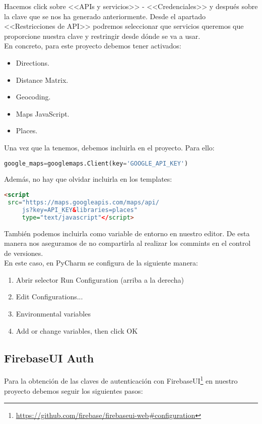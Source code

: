 Hacemos click sobre <<APIs y servicios>> - <<Credenciales>> y después sobre la clave que se nos ha generado anteriormente. Desde el apartado <<Restricciones de API>> podremos seleccionar que servicios queremos que proporcione nuestra clave y restringir desde dónde se va a usar.\\
En concreto, para este proyecto debemos tener activados:
\begin{itemize}
	\item Directions.
	\item Distance Matrix.
	\item Geocoding.
	\item Maps JavaScript.
	\item Places.
\end{itemize}


Una vez que la tenemos, debemos incluirla en el proyecto. Para ello:
\renewcommand{\lstlistingname}{Google Key}%
\renewcommand{\lstlistlistingname}{List of \lstlistingname s}
\begin{lstlisting}[language=python,caption={Añadir \texttt{API\_KEY}}]
google_maps=googlemaps.Client(key='GOOGLE_API_KEY')
\end{lstlisting}

Además, no hay que olvidar incluirla en los templates:
\begin{lstlisting}[language=html,caption={Añadir \texttt{API\_KEY} a los templates}]
<script
 src="https://maps.googleapis.com/maps/api/
	 js?key=API_KEY&libraries=places" 
	 type="text/javascript"</script>
\end{lstlisting}

También podemos incluirla como variable de entorno en nuestro editor. De esta manera nos aseguramos de no compartirla al realizar los commints en el control de versiones.
\\
En este caso, en PyCharm se configura de la siguiente manera:
\begin{enumerate}
\item Abrir selector Run Configuration (arriba a la derecha)
\item Edit Configurations...
\item Environmental variables
\item Add or change variables, then click OK 
\end{enumerate}


\subsection{FirebaseUI Auth}
Para la obtención de las claves de autenticación con FirebaseUI\footnote{\url{https://github.com/firebase/firebaseui-web\#configuration}} en nuestro proyecto debemos seguir los siguientes pasos:

